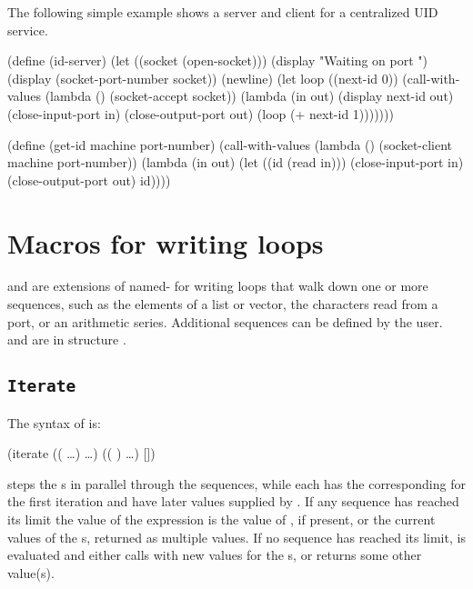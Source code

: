 The following simple example shows a server and client for a centralized UID
 service.
\begin{example}
(define (id-server)
  (let ((socket (open-socket)))
    (display "Waiting on port ")
    (display (socket-port-number socket))
    (newline)
    (let loop ((next-id 0))
      (call-with-values
        (lambda ()
          (socket-accept socket))
        (lambda (in out)
          (display next-id out)
          (close-input-port in)
          (close-output-port out)
          (loop (+ next-id 1)))))))
         
(define (get-id machine port-number)
  (call-with-values
    (lambda ()
      (socket-client machine port-number))
    (lambda (in out)
      (let ((id (read in)))
        (close-input-port in)
        (close-output-port out)
        id))))
\end{example}

\section{Macros for writing loops}

 and  are extensions of named- for
 writing loops that walk down one or more sequences,
 such as the elements of a list or vector, the
 characters read from a port, or an arithmetic series.
Additional sequences can be defined by the user.
 and  are in structure .

\subsection{{\tt Iterate}}

The syntax of  is:
\begin{example}
  (iterate 
           ((   \ldots)
            \ldots)
           (( )
            \ldots)
    [])
\end{example}

 steps the s in parallel through the
 sequences, while each  has the corresponding
  for the first iteration and have later values
 supplied by . 
If any sequence has reached its limit the value of the 
 expression is
 the value of , if present, or the current values of
 the s, returned as multiple values.
If no sequence has reached
 its limit,  is evaluated and either calls  with
 new values for the s, or returns some other value(s).

